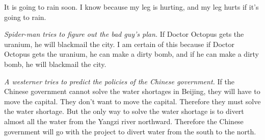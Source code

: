 \begin{exercises}
\item It is going to rain soon. I know because my leg is hurting, and my leg hurts if it’s going to rain. 



\item  \emph{Spider-man tries to figure out the bad guy’s plan.} If Doctor Octopus gets the uranium, he will blackmail the city. I am certain of this because if Doctor Octopus gets the uranium, he can make a dirty bomb, and if he can make a dirty bomb, he will blackmail the city.



\item \emph{A westerner tries to predict the policies of the Chinese government.} If the Chinese government cannot solve the water shortages in Beijing, they will have to move the capital. They don’t want to move the capital. Therefore they must solve the water shortage. But the only way to solve the water shortage is to divert almost all the water from the Yangzi river northward. Therefore the Chinese government will go with the project to divert water from the south to the north.       





\end{exercises}




